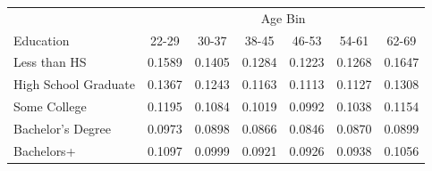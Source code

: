 \begin{tabular}{lcccccc}
\hline\hline
 & \multicolumn{6}{c}{Age Bin} \\
Education & 22-29 & 30-37 & 38-45 & 46-53 & 54-61 & 62-69 \\
\hline
Less than HS&0.1589&0.1405&0.1284&0.1223&0.1268&0.1647\\
High School Graduate&0.1367&0.1243&0.1163&0.1113&0.1127&0.1308\\
Some College&0.1195&0.1084&0.1019&0.0992&0.1038&0.1154\\
Bachelor's Degree&0.0973&0.0898&0.0866&0.0846&0.0870&0.0899\\
Bachelors+&0.1097&0.0999&0.0921&0.0926&0.0938&0.1056\\
\hline\hline
\end{tabular}
